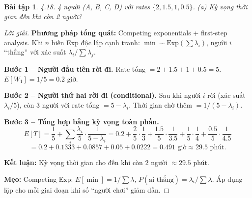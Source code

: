 \documentclass[8pt,a4paper]{article}
\newtheorem{exercise}{Bài tập}
\newenvironment{solution}{\begin{proof}[Lời giải]}{\end{proof}}
\begin{document}
\begin{exercise}
4.18. 4 người (A, B, C, D) với rates $\{2, 1.5, 1, 0.5\}$. 
(a) Kỳ vọng thời gian đến khi còn 2 người?
\end{exercise}
\begin{solution}
\textbf{Phương pháp tổng quát:} Competing exponentials + first-step analysis. Khi $n$ biến Exp độc lập cạnh tranh: $\min \sim \text{Exp}(\sum \lambda_i)$, người $i$ ``thắng'' với xác suất $\lambda_i/\sum \lambda_j$.

\textbf{Bước 1 -- Người đầu tiên rời đi.} Rate tổng $= 2 + 1.5 + 1 + 0.5 = 5$.
$E[W_1] = 1/5 = 0.2$ giờ.

\textbf{Bước 2 -- Người thứ hai rời đi (conditional).} Sau khi người $i$ rời (xác suất $\lambda_i/5$), còn 3 người với rate tổng $= 5 - \lambda_i$. Thời gian chờ thêm $= 1/(5-\lambda_i)$.

\textbf{Bước 3 -- Tổng hợp bằng kỳ vọng toàn phần.}
\[
E[T] = \frac{1}{5} + \sum_i \frac{\lambda_i}{5} \cdot \frac{1}{5-\lambda_i}
= 0.2 + \frac{2}{5}\cdot\frac{1}{3} + \frac{1.5}{5}\cdot\frac{1}{3.5} + \frac{1}{5}\cdot\frac{1}{4} + \frac{0.5}{5}\cdot\frac{1}{4.5}
\]
\[
= 0.2 + 0.1333 + 0.0857 + 0.05 + 0.0222 = \boxed{0.491 \text{ giờ}} \approx 29.5 \text{ phút}.
\]

\textbf{Kết luận:} Kỳ vọng thời gian cho đến khi còn 2 người $\approx 29.5$ phút.

\textbf{Mẹo:} Competing Exp: $E[\min] = 1/\sum\lambda$, $P(\text{ai thắng}) = \lambda_i/\sum\lambda$. Áp dụng lặp cho mỗi giai đoạn khi số ``người chơi'' giảm dần.
\end{solution}
\end{document}
